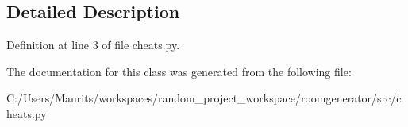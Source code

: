 \subsection{Detailed Description}


Definition at line 3 of file cheats.\+py.



The documentation for this class was generated from the following file\+:\begin{DoxyCompactItemize}
\item 
C\+:/\+Users/\+Maurits/workspaces/random\+\_\+project\+\_\+workspace/roomgenerator/src/cheats.\+py\end{DoxyCompactItemize}
